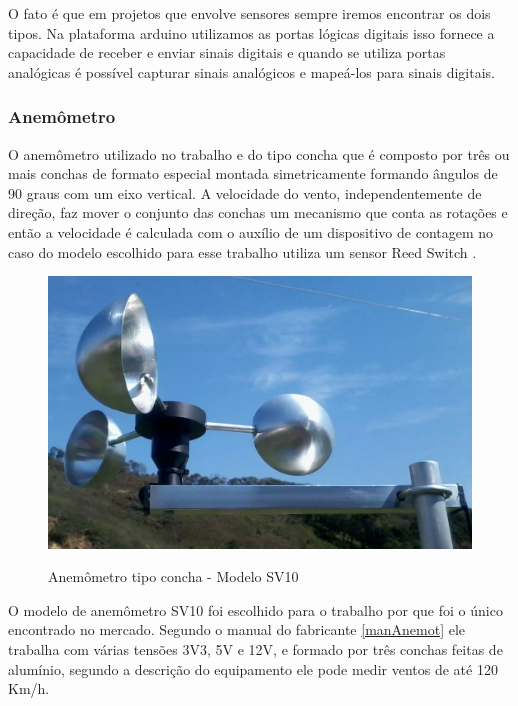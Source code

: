 O fato é que em projetos que envolve sensores sempre iremos encontrar os dois tipos. Na plataforma arduino utilizamos as portas lógicas digitais isso fornece a capacidade de receber e enviar sinais digitais e quando se utiliza portas analógicas é possível capturar sinais analógicos e mapeá-los para sinais digitais.

\subsubsection {Anemômetro}

O anemômetro utilizado no trabalho e do tipo concha que é composto por três ou mais conchas de formato especial montada simetricamente formando ângulos de 90 graus com um eixo vertical. A velocidade do vento, independentemente de direção, faz mover o conjunto das conchas um mecanismo que conta as rotações e então a velocidade é calculada com o auxílio de um dispositivo de contagem no caso do modelo escolhido para esse trabalho utiliza um sensor Reed Switch \cite{USINAINFOBLOG}.

\begin{figure} [!h]
    \centering
    \caption{Anemômetro tipo concha - Modelo SV10}
    \includegraphics[scale=0.25]{Figuras/ane_SV10.png}
    \label{fig:anemometro}
\end{figure}

O modelo de anemômetro SV10 foi escolhido para o trabalho por que foi o único encontrado no mercado. Segundo o manual do fabricante \ref{manAnemot} ele trabalha com várias tensões 3V3, 5V e 12V, e formado por três conchas feitas de alumínio, segundo a descrição do equipamento ele pode medir ventos de até 120 Km/h\cite{USINAINFOBLOG}.

